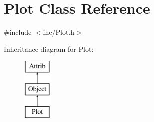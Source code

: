 \hypertarget{classPlot}{}\section{Plot Class Reference}
\label{classPlot}


{\ttfamily \#include $<$inc/\+Plot.\+h$>$}

Inheritance diagram for Plot\+:\begin{figure}[H]
\begin{center}
\leavevmode
\includegraphics[height=3.000000cm]{classPlot}
\end{center}
\end{figure}
